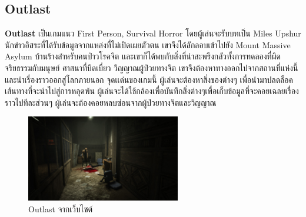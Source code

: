 \subsection{Outlast}
\subsubitem \textbf{Outlast} \cite{outlast:theory} เป็นเกมแนว First Person, Survival Horror โดยผู้เล่นจะรับบทเป็น Miles Upshur นักข่าวอิสระที่ได้รับข้อมูลจากแหล่งที่ไม่เปิดเผยตัวตน เขาจึงได้ลักลอบเข้าไปยัง Mount Massive Asylum บ้านร้างสำหรับคนป่าวโรคจิต และเขาก็ได้พบกับสิ่งที่น่าสะพรึงกลัวทั้งการทดลองที่ผิดจริยธรรมกับมนุษย์ ศาสนาที่บิดเบี่ยว วิญญาณผู้ป่วยทางจิต เขาจึงต้องหาทางออกไปจากสถานที่แห่งนี้ และนำเรื่องราวออกสู่โลกภายนอก จุดเเด่นของเกมนี้ ผู้เล่นจะต้องหาสิ่งของต่างๆ เพื่อนำมาปลดล็อคเส้นทางที่จะนำไปสู่การหลุดพ้น ผู้เล่นจะได้ใช้กล้องเพื่อบันทึกสิ่งต่างๆเพื่อเก็บข้อมูลที่จะคอยเฉลยเรื่องราวไปทีละส่วนๆ ผู้เล่นจะต้องคอยหลบซ่อนจากผู้ป่วยทางจิตและวิญญาณ
\begin{figure}[h]
  \centering
  \includegraphics[width=0.6\textwidth, height=0.2\textheight]{Images/OutlastScreenShot-04-1920x1080.jpg}
  \caption{Outlast จากเว็บไซต์}\label{OutlastScreenShot}
\end{figure}

